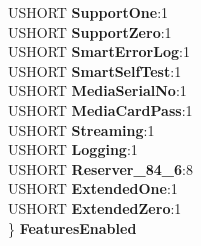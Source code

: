 \begin{DoxyCompactItemize}
\begin{tabbing}
\>USHORT {\bfseries SupportOne}:1\\
\>USHORT {\bfseries SupportZero}:1\\
\>USHORT {\bfseries SmartErrorLog}:1\\
\>USHORT {\bfseries SmartSelfTest}:1\\
\>USHORT {\bfseries MediaSerialNo}:1\\
\>USHORT {\bfseries MediaCardPass}:1\\
\>USHORT {\bfseries Streaming}:1\\
\>USHORT {\bfseries Logging}:1\\
\>USHORT {\bfseries Reserver\_84\_6}:8\\
\>USHORT {\bfseries ExtendedOne}:1\\
\>USHORT {\bfseries ExtendedZero}:1\\
\} {\bfseries FeaturesEnabled}\\


\end{tabbing}
\end{DoxyCompactItemize}
